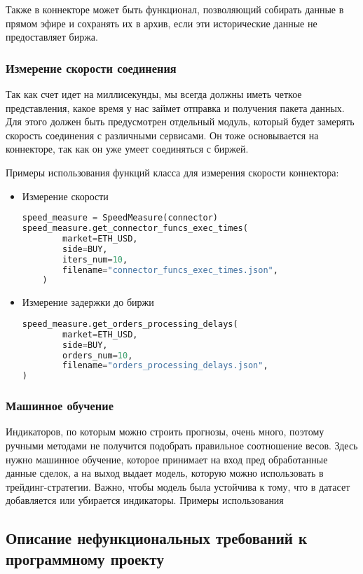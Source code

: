 Также в коннекторе может быть функционал, позволяющий собирать данные в прямом эфире и сохранять их в архив, если эти исторические данные не предоставляет биржа.

\subsubsection{Измерение скорости соединения}
Так как счет идет на миллисекунды, мы всегда должны иметь четкое представления, какое время у нас займет отправка и получения пакета данных. Для этого должен быть предусмотрен отдельный модуль, который будет замерять скорость соединения с различными сервисами. Он тоже основывается на коннекторе, так как он уже умеет соединяться с биржей.

Примеры использования функций класса для измерения скорости коннектора:
\begin{itemize}
\item Измерение скорости
\begin{lstlisting}[language=Python]
speed_measure = SpeedMeasure(connector)
speed_measure.get_connector_funcs_exec_times(
        market=ETH_USD,
        side=BUY,
        iters_num=10,
        filename="connector_funcs_exec_times.json",
    )
\end{lstlisting}

\item Измерение задержки до биржи
\begin{lstlisting}[language=Python]
speed_measure.get_orders_processing_delays(
        market=ETH_USD,
        side=BUY,
        orders_num=10,
        filename="orders_processing_delays.json",
)
\end{lstlisting}
\end{itemize}

\subsubsection{Машинное обучение}
Индикаторов, по которым можно строить прогнозы, очень много, поэтому ручными методами не получится подобрать правильное соотношение весов. Здесь нужно машинное обучение, которое принимает на вход пред обработанные данные сделок, а на выход выдает модель, которую можно использовать в трейдинг-стратегии. Важно, чтобы модель была устойчива к тому, что в датасет добавляется или убирается индикаторы.
Примеры использования

\subsection{Описание нефункциональных требований к программному проекту}


